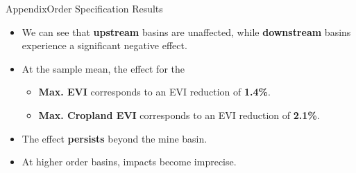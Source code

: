 \documentclass[aspectratio=169,11pt,dvipsnames, handout]{beamer}
\begin{document}
\begin{frame}{\textcolor{defaultclr!30}{Appendix}\hspace{0.75em}Order Specification Results}
\label{frame:orderapp}

\begin{itemize}
    \item We can see that \colorbox{upcol!30}{\bfseries upstream} basins are unaffected, while \colorbox{downcol!30}{\bfseries downstream} basins experience a significant negative effect.

    \vspace{1em} 

\item At the sample mean, the effect for the

\vspace{0.5em}

\begin{itemize}
    \item \colorbox{defaultclr!30}{\bfseries Max. EVI} corresponds to an EVI reduction of \textbf{1.4\%}.
    \vspace{0.25em}
    \item \colorbox{secondclr!30}{\bfseries Max. Cropland EVI} corresponds to an EVI reduction of \textbf{2.1\%}.
\end{itemize}

\vspace{1em} 

\item The effect \textbf{persists} beyond the mine basin.

\vspace{1em}

\item At higher order basins, impacts become imprecise.

\end{itemize}

\centering\hyperlink{frame:order}{}

\end{frame}

\end{document}
